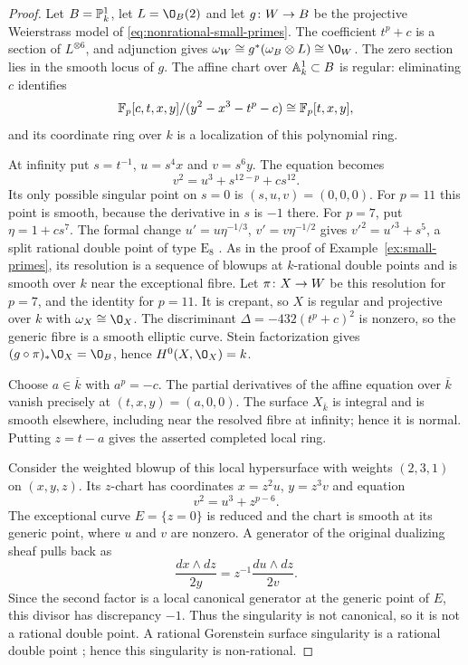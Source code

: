 \begin{proof}
Let $B = \PP^1_k$, let $L = \O_B(2)$ and let $g\from W\to B$ be the projective Weierstrass model of \eqref{eq:nonrational-small-primes}.
The coefficient $t^p+c$ is a section of $L^{\otimes 6}$, and adjunction gives $\omega_W\cong g^*(\omega_B\otimes L)\cong\O_W$.
The zero section lies in the smooth locus of $g$.
The affine chart over $\AA^1_k\subset B$ is regular: eliminating $c$ identifies
\[
  \FF_p[c,t,x,y]/(y^2-x^3-t^p-c)\cong\FF_p[t,x,y],
\]
and its coordinate ring over $k$ is a localization of this polynomial ring.

At infinity put $s = t^{-1}$, $u = s^4x$ and $v = s^6y$.
The equation becomes
\[
  v^2 = u^3+s^{12-p}+cs^{12}.
\]
Its only possible singular point on $s = 0$ is $(s,u,v) = (0,0,0)$.
For $p = 11$ this point is smooth, because the derivative in $s$ is $-1$ there.
For $p = 7$, put $\eta = 1+cs^7$.
The formal change $u' = u\eta^{-1/3}$, $v' = v\eta^{-1/2}$ gives $v'^2 = u'^3+s^5$, a split rational double point of type $\mathrm E_8$ \cite{Art77}.
As in the proof of Example~\ref{ex:small-primes}, its resolution is a sequence of blowups at $k$-rational double points and is smooth over $k$ near the exceptional fibre.
Let $\pi\from X\to W$ be this resolution for $p = 7$, and the identity for $p = 11$.
It is crepant, so $X$ is regular and projective over $k$ with $\omega_X\cong\O_X$.
The discriminant $\Delta = -432(t^p+c)^2$ is nonzero, so the generic fibre is a smooth elliptic curve.
Stein factorization gives $(g\circ\pi)_*\O_X = \O_B$, hence $H^0(X,\O_X) = k$.

Choose $a\in\overline k$ with $a^p = -c$.
The partial derivatives of the affine equation over $\overline k$ vanish precisely at $(t,x,y) = (a,0,0)$.
The surface $X_{\bar k}$ is integral and is smooth elsewhere, including near the resolved fibre at infinity; hence it is normal.
Putting $z = t-a$ gives the asserted completed local ring.

Consider the weighted blowup of this local hypersurface with weights $(2,3,1)$ on $(x,y,z)$.
Its $z$-chart has coordinates $x = z^2u$, $y = z^3v$ and equation
\[
  v^2 = u^3+z^{p-6}.
\]
The exceptional curve $E = \{z = 0\}$ is reduced and the chart is smooth at its generic point, where $u$ and $v$ are nonzero.
A generator of the original dualizing sheaf pulls back as
\[
  \frac{dx\wedge dz}{2y}
  = z^{-1}\frac{du\wedge dz}{2v}.
\]
Since the second factor is a local canonical generator at the generic point of $E$, this divisor has discrepancy $-1$.
Thus the singularity is not canonical, so it is not a rational double point.
A rational Gorenstein surface singularity is a rational double point \cite[Tag~]{Stacks}; hence this singularity is non-rational.
\end{proof}
